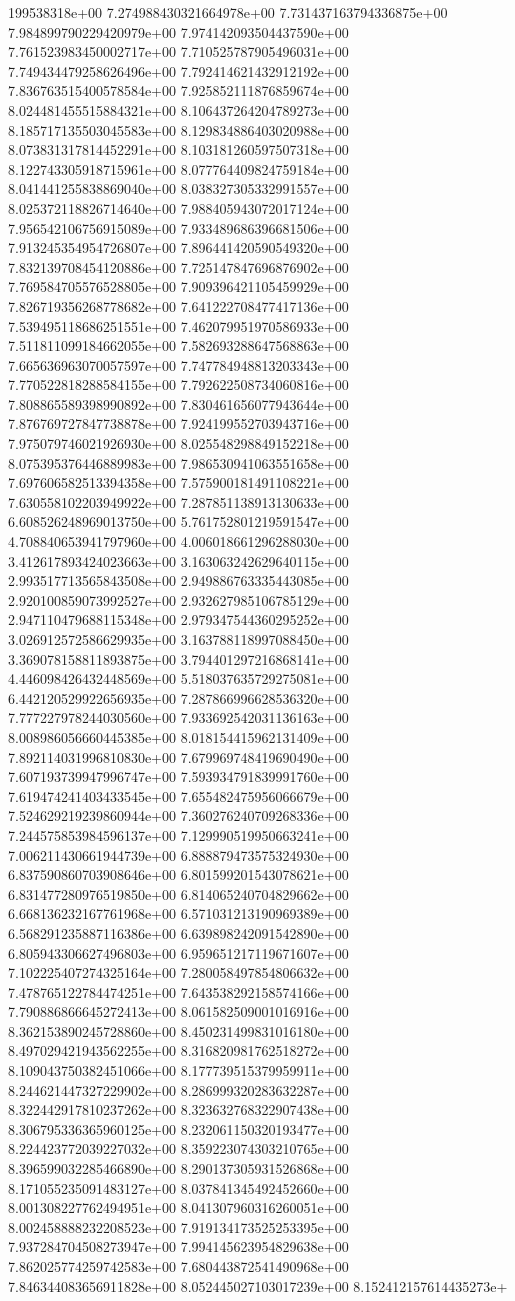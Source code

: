 199538318e+00	7.274988430321664978e+00	7.731437163794336875e+00	7.984899790229420979e+00	7.974142093504437590e+00	7.761523983450002717e+00	7.710525787905496031e+00	7.749434479258626496e+00	7.792414621432912192e+00	7.836763515400578584e+00	7.925852111876859674e+00	8.024481455515884321e+00	8.106437264204789273e+00	8.185717135503045583e+00	8.129834886403020988e+00	8.073831317814452291e+00	8.103181260597507318e+00	8.122743305918715961e+00	8.077764409824759184e+00	8.041441255838869040e+00	8.038327305332991557e+00	8.025372118826714640e+00	7.988405943072017124e+00	7.956542106756915089e+00	7.933489686396681506e+00	7.913245354954726807e+00	7.896441420590549320e+00	7.832139708454120886e+00	7.725147847696876902e+00	7.769584705576528805e+00	7.909396421105459929e+00	7.826719356268778682e+00	7.641222708477417136e+00	7.539495118686251551e+00	7.462079951970586933e+00	7.511811099184662055e+00	7.582693288647568863e+00	7.665636963070057597e+00	7.747784948813203343e+00	7.770522818288584155e+00	7.792622508734060816e+00	7.808865589398990892e+00	7.830461656077943644e+00	7.876769727847738878e+00	7.924199552703943716e+00	7.975079746021926930e+00	8.025548298849152218e+00	8.075395376446889983e+00	7.986530941063551658e+00	7.697606582513394358e+00	7.575900181491108221e+00	7.630558102203949922e+00	7.287851138913130633e+00	6.608526248969013750e+00	5.761752801219591547e+00	4.708840653941797960e+00	4.006018661296288030e+00	3.412617893424023663e+00	3.163063242629640115e+00	2.993517713565843508e+00	2.949886763335443085e+00	2.920100859073992527e+00	2.932627985106785129e+00	2.947110479688115348e+00	2.979347544360295252e+00	3.026912572586629935e+00	3.163788118997088450e+00	3.369078158811893875e+00	3.794401297216868141e+00	4.446098426432448569e+00	5.518037635729275081e+00	6.442120529922656935e+00	7.287866996628536320e+00	7.777227978244030560e+00	7.933692542031136163e+00	8.008986056660445385e+00	8.018154415962131409e+00	7.892114031996810830e+00	7.679969748419690490e+00	7.607193739947996747e+00	7.593934791839991760e+00	7.619474241403433545e+00	7.655482475956066679e+00	7.524629219239860944e+00	7.360276240709268336e+00	7.244575853984596137e+00	7.129990519950663241e+00	7.006211430661944739e+00	6.888879473575324930e+00	6.837590860703908646e+00	6.801599201543078621e+00	6.831477280976519850e+00	6.814065240704829662e+00	6.668136232167761968e+00	6.571031213190969389e+00	6.568291235887116386e+00	6.639898242091542890e+00	6.805943306627496803e+00	6.959651217119671607e+00	7.102225407274325164e+00	7.280058497854806632e+00	7.478765122784474251e+00	7.643538292158574166e+00	7.790886866645272413e+00	8.061582509001016916e+00	8.362153890245728860e+00	8.450231499831016180e+00	8.497029421943562255e+00	8.316820981762518272e+00	8.109043750382451066e+00	8.177739515379959911e+00	8.244621447327229902e+00	8.286999320283632287e+00	8.322442917810237262e+00	8.323632768322907438e+00	8.306795336365960125e+00	8.232061150320193477e+00	8.224423772039227032e+00	8.359223074303210765e+00	8.396599032285466890e+00	8.290137305931526868e+00	8.171055235091483127e+00	8.037841345492452660e+00	8.001308227762494951e+00	8.041307960316260051e+00	8.002458888232208523e+00	7.919134173525253395e+00	7.937284704508273947e+00	7.994145623954829638e+00	7.862025774259742583e+00	7.680443872541490968e+00	7.846344083656911828e+00	8.052445027103017239e+00	8.152412157614435273e+